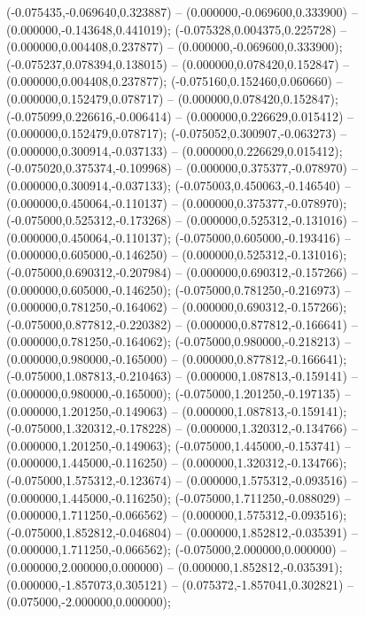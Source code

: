  (-0.075435,-0.069640,0.323887) -- (0.000000,-0.069600,0.333900) -- (0.000000,-0.143648,0.441019);
 (-0.075328,0.004375,0.225728) -- (0.000000,0.004408,0.237877) -- (0.000000,-0.069600,0.333900);
 (-0.075237,0.078394,0.138015) -- (0.000000,0.078420,0.152847) -- (0.000000,0.004408,0.237877);
 (-0.075160,0.152460,0.060660) -- (0.000000,0.152479,0.078717) -- (0.000000,0.078420,0.152847);
 (-0.075099,0.226616,-0.006414) -- (0.000000,0.226629,0.015412) -- (0.000000,0.152479,0.078717);
 (-0.075052,0.300907,-0.063273) -- (0.000000,0.300914,-0.037133) -- (0.000000,0.226629,0.015412);
 (-0.075020,0.375374,-0.109968) -- (0.000000,0.375377,-0.078970) -- (0.000000,0.300914,-0.037133);
 (-0.075003,0.450063,-0.146540) -- (0.000000,0.450064,-0.110137) -- (0.000000,0.375377,-0.078970);
 (-0.075000,0.525312,-0.173268) -- (0.000000,0.525312,-0.131016) -- (0.000000,0.450064,-0.110137);
 (-0.075000,0.605000,-0.193416) -- (0.000000,0.605000,-0.146250) -- (0.000000,0.525312,-0.131016);
 (-0.075000,0.690312,-0.207984) -- (0.000000,0.690312,-0.157266) -- (0.000000,0.605000,-0.146250);
 (-0.075000,0.781250,-0.216973) -- (0.000000,0.781250,-0.164062) -- (0.000000,0.690312,-0.157266);
 (-0.075000,0.877812,-0.220382) -- (0.000000,0.877812,-0.166641) -- (0.000000,0.781250,-0.164062);
 (-0.075000,0.980000,-0.218213) -- (0.000000,0.980000,-0.165000) -- (0.000000,0.877812,-0.166641);
 (-0.075000,1.087813,-0.210463) -- (0.000000,1.087813,-0.159141) -- (0.000000,0.980000,-0.165000);
 (-0.075000,1.201250,-0.197135) -- (0.000000,1.201250,-0.149063) -- (0.000000,1.087813,-0.159141);
 (-0.075000,1.320312,-0.178228) -- (0.000000,1.320312,-0.134766) -- (0.000000,1.201250,-0.149063);
 (-0.075000,1.445000,-0.153741) -- (0.000000,1.445000,-0.116250) -- (0.000000,1.320312,-0.134766);
 (-0.075000,1.575312,-0.123674) -- (0.000000,1.575312,-0.093516) -- (0.000000,1.445000,-0.116250);
 (-0.075000,1.711250,-0.088029) -- (0.000000,1.711250,-0.066562) -- (0.000000,1.575312,-0.093516);
 (-0.075000,1.852812,-0.046804) -- (0.000000,1.852812,-0.035391) -- (0.000000,1.711250,-0.066562);
 (-0.075000,2.000000,0.000000) -- (0.000000,2.000000,0.000000) -- (0.000000,1.852812,-0.035391);
 (0.000000,-1.857073,0.305121) -- (0.075372,-1.857041,0.302821) -- (0.075000,-2.000000,0.000000);
